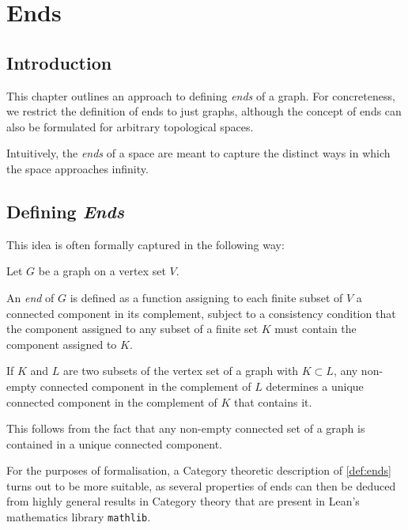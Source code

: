 \chapter{Ends}\label{chap:ends}

\section{Introduction}
\label{sec:ends_intro}

This chapter outlines an approach to defining \emph{ends} of a graph. For concreteness, we restrict the definition of ends to just graphs, although the concept of ends can also be formulated for arbitrary topological spaces.

Intuitively, the \textit{ends} of a space are meant to capture the distinct ways in which the space approaches infinity.

\section{Defining \emph{Ends}}
\label{sec:ends_def}

This idea is often formally captured in the following way:
\begin{definition}[Ends]
  \label{def:ends}
  Let $G$ be a graph on a vertex set $V$.

  An \emph{end} of $G$ is defined as a function assigning to each finite subset of $V$ a connected component in its complement, subject to a consistency condition that the component assigned to any subset of a finite set $K$ must contain the component assigned to $K$.
\end{definition}

\begin{remark}
  \label{def:back_comp_map}
  If $K$ and $L$ are two subsets of the vertex set of a graph with $K \subset L$, any non-empty connected component in the complement of $L$ determines a unique connected component in the complement of $K$ that contains it.

  This follows from the fact that any non-empty connected set of a graph is contained in a unique connected component.
\end{remark}

For the purposes of formalisation, a Category theoretic description of \ref{def:ends} turns out to be more suitable, as several properties of ends can then be deduced from highly general results in Category theory that are present in Lean's mathematics library \texttt{mathlib}.

